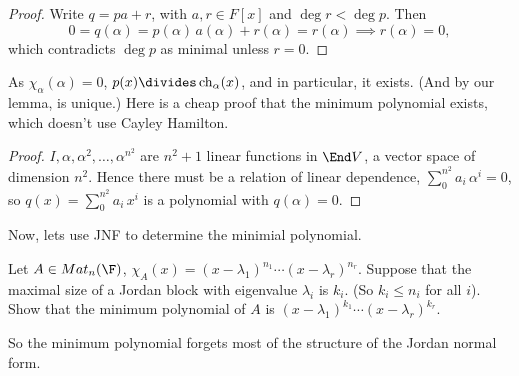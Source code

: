 \begin{proof}
	Write $q=pa+r$, with $a,r\in F[x]$ and $\deg r < \deg p$. Then %
	\begin{equation*}
		0 = q(\alpha) = p(\alpha)\,a(\alpha) + r(\alpha) = r(\alpha)
		\implies r(\alpha)=0,
	\end{equation*}
	which contradicts $\deg p$ as minimal unless $r=0$.
\end{proof}

As $\chi_\alpha(\alpha)=0$, $p(x) \divides \chi_\alpha(x)$, and in particular, it exists. (And by our lemma, is unique.) Here is a cheap proof that  the minimum polynomial %
exists, which doesn't use Cayley Hamilton.

\begin{proof}
	$I, \alpha, \alpha^2,\dots,\alpha^{n^2}$ are $n^2 +1$ linear functions in $\End V$, a vector space of dimension $n^2$. Hence there must be a relation of linear dependence, $\sum_0^{n^2} a_i \, \alpha^i = 0$, so $q(x) = \sum_0^{n^2} a_i \, x^i$ is a polynomial with $q(\alpha) = 0$. %
\end{proof}

Now, lets use JNF to determine the minimial polynomial.
\begin{exercise} Let $A \in Mat_n(\F)$, $\chi_A(x) = (x-\lambda_1)^{n_1}\cdots(x-\lambda_r)^{n_r}$. Suppose that the maximal size of a Jordan block with eigenvalue $\lambda_i$ is $k_i$. (So $k_i \leq n_i$ for all $i$). 
Show that the minimum polynomial of $A$ is $(x-\lambda_1)^{k_1}\cdots(x-\lambda_r)^{k_r}$.
\end{exercise}
So the minimum polynomial forgets most of the structure of the Jordan normal form.



